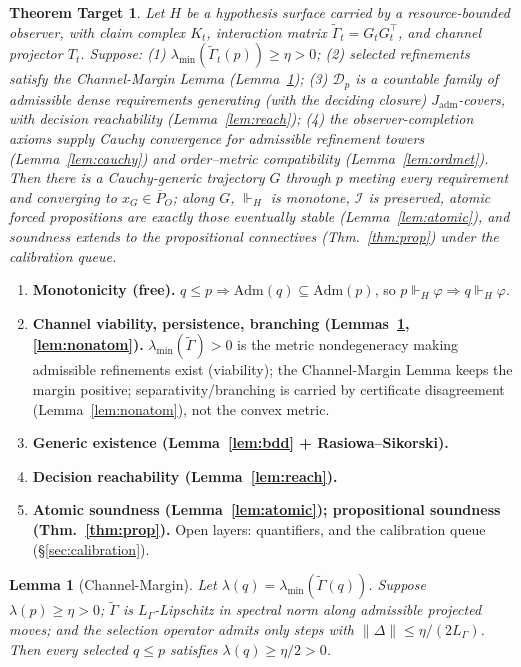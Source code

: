 \documentclass[11pt]{article}
\newtheorem{lemma}{Lemma}
\newtheorem*{theoremtarget}{Theorem Target}
\theoremstyle{definition}
\theoremstyle{remark}
\newcommand{\forcesH}{\Vdash_{H}}
\newcommand{\refines}{\leq}
\newcommand{\Gam}{\tilde{\Gamma}}
\newcommand{\lmin}{\lambda_{\min}}
\newcommand{\Adm}{\mathrm{Adm}}
\newcommand{\Kt}{K_{t}}
\newcommand{\Jadm}{J_{\mathrm{adm}}}
\begin{document}
\begin{theoremtarget}
Let $H$ be a hypothesis surface carried by a resource-bounded observer, with claim complex $\Kt$,
interaction matrix $\Gam_t=G_tG_t^{\top}$, and channel projector $T_t$. Suppose: (1)
$\lmin(\Gam_t(p))\ge\eta>0$; (2) selected refinements satisfy the Channel-Margin Lemma
(Lemma~\ref{lem:margin}); (3) $\mathcal{D}_p$ is a countable family of admissible dense requirements
generating (with the deciding closure) $\Jadm$-covers, with decision reachability
(Lemma~\ref{lem:reach}); (4) the observer-completion axioms supply Cauchy convergence for admissible
refinement towers (Lemma~\ref{lem:cauchy}) and order--metric compatibility (Lemma~\ref{lem:ordmet}).
Then there is a Cauchy-generic trajectory $G$ through $p$ meeting every requirement and converging to
$x_G\in\overline{P}_O$; along $G$, $\forcesH$ is monotone, $\mathcal{I}$ is preserved, atomic forced
propositions are exactly those eventually stable (Lemma~\ref{lem:atomic}), and soundness extends to
the propositional connectives (Thm.~\ref{thm:prop}) under the calibration queue.
\end{theoremtarget}

\begin{enumerate}[leftmargin=1.6em]
\item \textbf{Monotonicity (free).} $q\refines p\Rightarrow\Adm(q)\subseteq\Adm(p)$, so
  $p\forcesH\varphi\Rightarrow q\forcesH\varphi$.
\item \textbf{Channel viability, persistence, branching (Lemmas~\ref{lem:margin}, \ref{lem:nonatom}).}
  $\lmin(\Gam)>0$ is the metric nondegeneracy making admissible refinements exist (viability); the
  Channel-Margin Lemma keeps the margin positive; separativity/branching is carried by certificate
  disagreement (Lemma~\ref{lem:nonatom}), not the convex metric.
\item \textbf{Generic existence (Lemma~\ref{lem:bdd} + Rasiowa--Sikorski).}
\item \textbf{Decision reachability (Lemma~\ref{lem:reach}).}
\item \textbf{Atomic soundness (Lemma~\ref{lem:atomic}); propositional soundness (Thm.~\ref{thm:prop}).}
  Open layers: quantifiers, and the calibration queue (\S\ref{sec:calibration}).
\end{enumerate}

\begin{lemma}[Channel-Margin]\label{lem:margin}
Let $\lambda(q)=\lmin(\Gam(q))$. Suppose $\lambda(p)\ge\eta>0$; $\Gam$ is $L_\Gamma$-Lipschitz in
spectral norm along admissible projected moves; and the selection operator admits only steps with
$\|\Delta\|\le\eta/(2L_\Gamma)$. Then every selected $q\refines p$ satisfies $\lambda(q)\ge\eta/2>0$.
\end{lemma}
\end{document}
